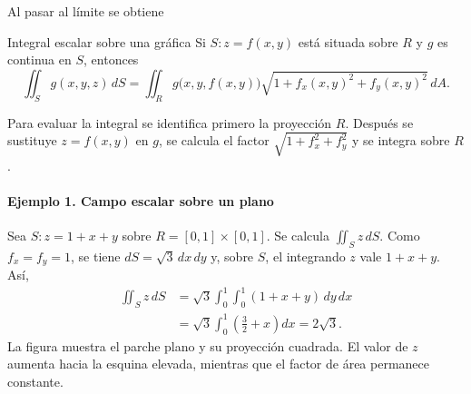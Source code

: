Al pasar al límite se obtiene
\begin{mytheorem}{Integral escalar sobre una gráfica}
Si $S:z=f(x,y)$ está situada sobre $R$ y $g$ es continua en $S$, entonces
\[
\iint_S g(x,y,z)\,dS
=\iint_R g\bigl(x,y,f(x,y)\bigr)
\sqrt{1+f_x(x,y)^2+f_y(x,y)^2}\,dA.
\]
\end{mytheorem}

Para evaluar la integral se identifica primero la proyección $R$. Después se sustituye $z=f(x,y)$ en $g$, se calcula el factor $\sqrt{1+f_x^2+f_y^2}$ y se integra sobre $R$.

\paragraph{Ejemplo 1. Campo escalar sobre un plano}
Sea $S:z=1+x+y$ sobre $R=[0,1]\times[0,1]$. Se calcula $\iint_S z\,dS$. Como $f_x=f_y=1$, se tiene $dS=\sqrt3\,dx\,dy$ y, sobre $S$, el integrando $z$ vale $1+x+y$. Así,
\begin{align*}
\iint_S z\,dS
&=\sqrt3\int_0^1\int_0^1(1+x+y)\,dy\,dx\\
&=\sqrt3\int_0^1\left(\frac32+x\right)dx
=2\sqrt3.
\end{align*}
La figura muestra el parche plano y su proyección cuadrada. El valor de $z$ aumenta hacia la esquina elevada, mientras que el factor de área permanece constante.

\begingroup\shorthandoff{>}
\begin{center}
\end{center}
\endgroup

